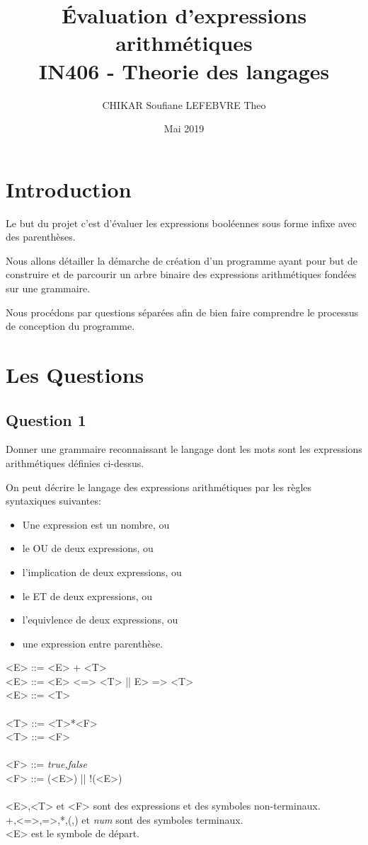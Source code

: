\documentclass[12pt,a4paper]{article}
\title{Évaluation d’expressions arithmétiques \\ \large IN406 - Theorie des langages}
\author{CHIKAR Soufiane LEFEBVRE Theo}
\date{Mai 2019}
\begin{document}
\maketitle
\newpage
\tableofcontents
\newpage

\section{Introduction}

Le but du projet c'est d'évaluer les expressions booléennes sous forme infixe
avec des parenthèses.

Nous allons détailler la démarche de création d'un programme ayant pour but de 
construire et de parcourir un arbre binaire des expressions arithmétiques 
fondées sur une grammaire.

Nous procédons par questions séparées afin de bien faire comprendre le processus de conception du programme.

\newpage

\section{Les Questions}

\subsection{Question 1}
Donner une grammaire reconnaissant le langage dont les mots sont les expressions arithmétiques
définies ci-dessus.
\begin{mdframed}[hidealllines=true,backgroundcolor=blue!20]
On peut décrire le langage des expressions arithmétiques par les règles syntaxiques suivantes:

\begin{itemize}
\item Une expression est un nombre, ou
\item le OU de deux expressions, ou
\item l'implication de deux expressions, ou
\item le ET de deux expressions, ou
\item l'equivlence de deux expressions, ou
\item une expression entre parenthèse.
\end{itemize}
<E> ::= <E> + <T> \\
<E> ::= <E> <=> <T> || E> => <T> \\
<E> ::= <T> \\\\
<T> ::= <T>*<F>\\
<T> ::= <F>\\\\
<F> ::= \textit{true,false}\\
<F> ::= (<E>) || !(<E>)\\\\
<E>,<T> et <F> sont des expressions et des symboles non-terminaux.\\
+,<=>,=>,*,(,) et \textit{num} sont des symboles terminaux.\\
<E> est le symbole de départ.
\end{mdframed}
\end{document}
